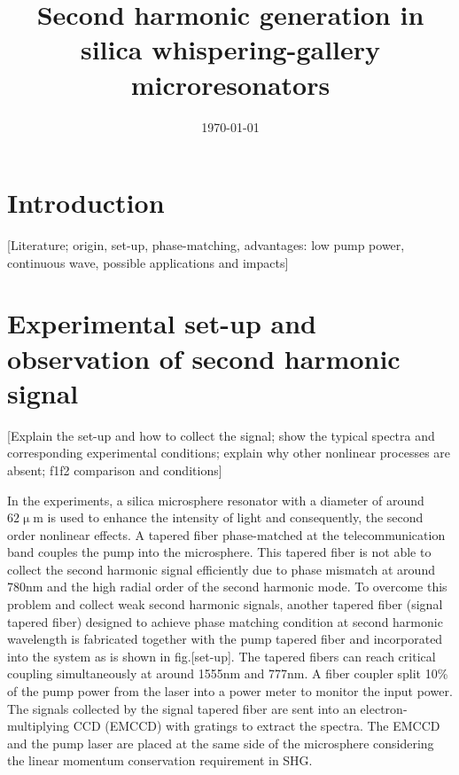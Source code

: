 \documentclass[a4paper,12pt,hyperref]{article}
\title{\bfseries \Large Second harmonic generation in silica whispering-gallery microresonators}
\date{\normalsize \today}
\begin{document}
\maketitle

\section{Introduction}

[Literature; origin, set-up, phase-matching, advantages: low pump power, continuous wave, possible applications and impacts]


\section{Experimental set-up and observation of second harmonic signal}
[Explain the set-up and how to collect the signal; show the typical spectra and corresponding experimental conditions; explain why other nonlinear processes are absent; f1f2 comparison and conditions]

In the experiments, a silica microsphere resonator with a diameter of around $62\upmu$m is used to enhance the intensity of light and  consequently, the second order nonlinear effects. A tapered fiber phase-matched at the telecommunication band couples the pump into the microsphere\cite{knight1997phase, cai2000observation}. This tapered fiber is not able to collect the second harmonic signal efficiently due to phase mismatch at around 780nm and the high radial order of the second harmonic mode\cite{carmon2007visible}. To overcome this problem and collect weak second harmonic signals, another tapered fiber (signal tapered fiber) designed to achieve phase matching condition at second harmonic wavelength is fabricated together with the pump tapered fiber and incorporated into the system as is shown in fig.[set-up]. The tapered fibers can reach critical coupling simultaneously at around 1555nm and 777nm. A fiber coupler split 10\% of the pump power from the laser into a power meter to monitor the input power. The signals collected by the signal tapered fiber are sent into an electron-multiplying CCD (EMCCD) with gratings to extract the spectra. The EMCCD and the pump laser are placed at the same side of the microsphere considering the linear momentum conservation requirement in SHG\cite{carmon2007visible, kozyreff2008whispering}.
\end{document}
